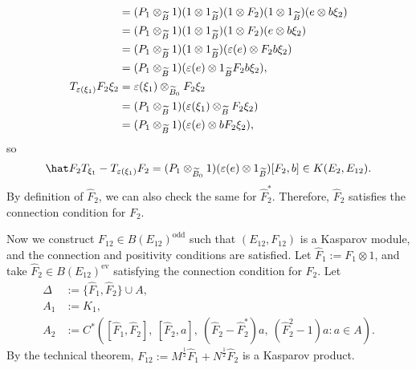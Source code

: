 \documentclass{../../large}
\begin{document}
\begin{pf}
\begin{align*}
&=(P_1\otimes_{\widetilde B}1)(1\otimes1_{\widetilde B})(1\otimes F_2)(1\otimes1_{\widetilde B})(e\otimes b\xi_2)\\
&=(P_1\otimes_{\widetilde B}1)(1\otimes1_{\widetilde B})(1\otimes F_2)(e\otimes b\xi_2)\\
&=(P_1\otimes_{\widetilde B}1)(1\otimes1_{\widetilde B})(\varepsilon(e)\otimes F_2b\xi_2)\\
&=(P_1\otimes_{\widetilde B}1)(\varepsilon(e)\otimes1_{\widetilde B}F_2b\xi_2),\\
T_{\varepsilon(\xi_1)}F_2\xi_2
&=\varepsilon(\xi_1)\otimes_{\widetilde B_0}F_2\xi_2\\
&=(P_1\otimes_{\widetilde B}1)(\varepsilon(\xi_1)\otimes_{\widetilde B}F_2\xi_2)\\
&=(P_1\otimes_{\widetilde B}1)(\varepsilon(e)\otimes bF_2\xi_2),
\end{align*}
so
\[\hat F_2T_{\xi_1}-T_{\e(\xi_1)}F_2=(P_1\otimes_{\tilde B_0}1)(\e(e)\otimes1_{\tilde B})[F_2,b]\in K(E_2,E_{12}).\]
By definition of $\hat F_2$, we can also check the same for $\hat F_2^*$.
Therefore, $\hat F_2$ satisfies the connection condition for $F_2$.

Now we construct $F_{12}\in B(E_{12})^{\mathrm{odd}}$ such that $(E_{12},F_{12})$ is a Kasparov module, and the connection and positivity conditions are satisfied.
Let $\hat F_1:=F_1\otimes1$, and take $\hat F_2\in B(E_{12})^{\mathrm{ev}}$ satisfying the connection condition for $F_2$.
Let
\begin{align*}
\Delta&:=\{\hat F_1,\hat F_2\}\cup A,\\
A_1&:=K_1,\\
A_2&:=C^*([\hat F_1,\hat F_2],\ [\hat F_2,a],\ (\hat F_2-\hat F_2^*)a,\ (\hat F_2^2-1)a:a\in A).
\end{align*}
By the technical theorem, $F_{12}:=M^{\frac12}\hat F_1+N^{\frac12}\hat F_2$ is a Kasparov product.





\end{pf}
\end{document}

